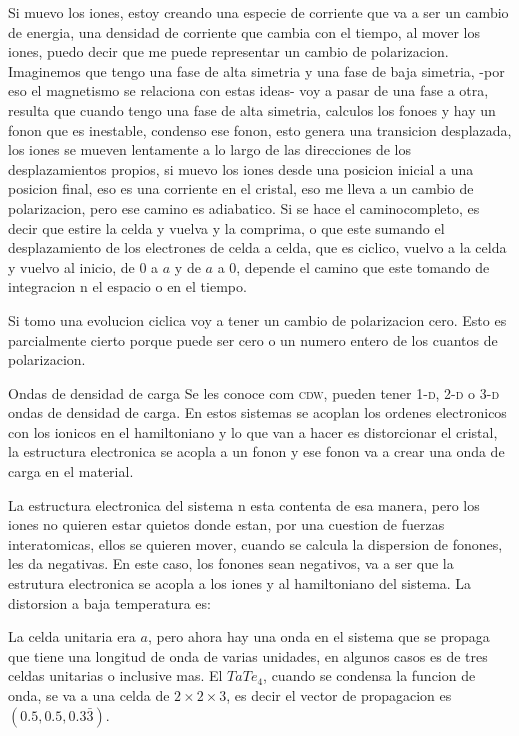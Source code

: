 \documentclass[11pt,fleqn]{book}
\begin{document}
Si muevo los iones, estoy creando una especie de corriente que va a ser un cambio de energia, una densidad de corriente que cambia con el tiempo, al mover los iones, puedo decir que me puede representar un cambio de polarizacion. Imaginemos que tengo una fase de alta simetria y una fase de baja simetria, -por eso el magnetismo se relaciona con estas ideas- voy a pasar de una fase a otra, resulta que cuando tengo una fase de alta simetria, calculos los fonoes y hay un fonon que es inestable, condenso ese fonon, esto genera una transicion desplazada, los iones se mueven  lentamente a lo largo de las direcciones de los desplazamientos propios, si muevo los iones desde una posicion inicial a una posicion final, eso es una corriente en el cristal, eso me lleva a un cambio de polarizacion, pero ese camino es adiabatico. Si se hace el caminocompleto, es decir que estire la celda y vuelva y la comprima, o que este sumando el desplazamiento de los electrones de celda a celda, que es ciclico, vuelvo a la celda y vuelvo al inicio, de $0$ a $a$ y de $a$ a $0$, depende  el camino que este tomando de integracion n el espacio o en el tiempo. 

Si tomo una evolucion ciclica voy a tener un cambio de polarizacion cero. Esto es parcialmente cierto porque puede ser cero o un numero entero de los cuantos de polarizacion. 

\begin{example}{Ondas de densidad de carga}
Se les conoce com \textsc{cdw}, pueden tener \textsc{1-d}, \textsc{2-d} o \textsc{3-d} ondas de densidad de carga. En estos sistemas se acoplan los ordenes electronicos con los ionicos en el hamiltoniano y lo que van a hacer es distorcionar el cristal, la estructura electronica se acopla a un fonon y ese fonon va a crear una onda de carga en el material. 


La estructura electronica del sistema n esta contenta de esa manera, pero los iones no quieren estar quietos donde estan, por una cuestion de fuerzas interatomicas, ellos se quieren mover, cuando se calcula la dispersion de fonones, les da negativas. En este caso, los fonones sean negativos, va a ser que la estrutura electronica se acopla a los iones y al hamiltoniano del sistema. La distorsion a baja temperatura es:


La celda unitaria era $a$, pero ahora hay una onda en el sistema que se propaga que tiene una longitud de onda de varias unidades, en algunos casos es de tres celdas unitarias o inclusive mas. El $TaTe_{4}$, cuando se condensa la funcion de onda, se va a una celda de $2\times2\times3$, es decir el vector de propagacion es $(0.5,0.5,0.3\bar{3})$.
\end{example}
\end{document}

